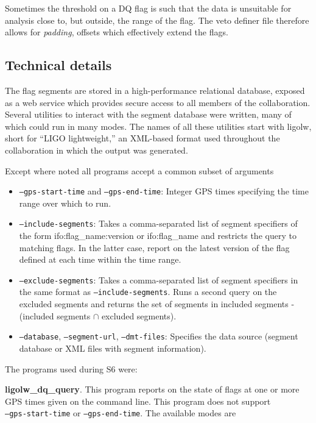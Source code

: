 Sometimes the threshold on a DQ flag is such that the data is
unsuitable for analysis close to, but outside, the range of the flag.
The veto definer file therefore allows for \emph{padding}, offsets 
which effectively extend the flags.

\iffalse
\subsection{Technical details}

The flag segments are stored in a high-performance relational
database, exposed as a web service which provides secure access to all
members of the collaboration.  Several utilities to interact with the
segment database were written, many of which could run in many modes.
The names of all these utilities start with ligolw, short for ``LIGO
lightweight,'' an XML-based format used throughout the collaboration
in which the output was generated.

Except where noted all programs accept a common subset of arguments
\begin{itemize}
\item \texttt{--gps-start-time} and \texttt{--gps-end-time}: Integer
GPS times specifying the time range over which to run.
\item \texttt{--include-segments}: Takes a comma-separated list of
segment specifiers of the form ifo:flag\_name:version or
ifo:flag\_name and restricts the query to matching flags.  In the
latter case, report on the latest version of the flag defined at each
time within the time range.
\item \texttt{--exclude-segments}: Takes a comma-separated list of
segment specifiers in the same format as \texttt{--include-segments}.
Runs a second query on the excluded segments and returns the set of
segments in included segments - (included segments $\cap$ excluded
segments).
\item \texttt{--database}, \texttt{--segment-url},
\texttt{--dmt-files}: Specifies the data source (segment database or
XML files with segment information).
\end{itemize}


The programs used during S6 were:

\textbf{ligolw\_dq\_query}.  This program reports on the state of
flags at one or more GPS times given on the command line.  This
program does not support \\
\texttt{--gps-start-time} or \texttt{--gps-end-time}.   The available modes are

